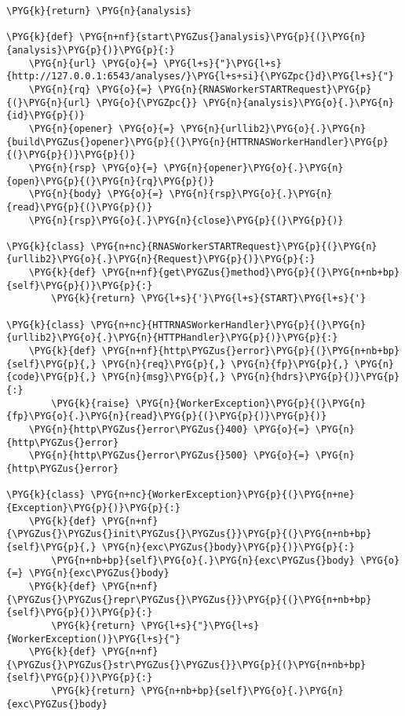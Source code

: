 \begin{Verbatim}[commandchars=\\\{\}]
    \PYG{k}{return} \PYG{n}{analysis}

\PYG{k}{def} \PYG{n+nf}{start\PYGZus{}analysis}\PYG{p}{(}\PYG{n}{analysis}\PYG{p}{)}\PYG{p}{:}
    \PYG{n}{url} \PYG{o}{=} \PYG{l+s}{"}\PYG{l+s}{http://127.0.0.1:6543/analyses/}\PYG{l+s+si}{\PYGZpc{}d}\PYG{l+s}{"}
    \PYG{n}{rq} \PYG{o}{=} \PYG{n}{RNASWorkerSTARTRequest}\PYG{p}{(}\PYG{n}{url} \PYG{o}{\PYGZpc{}} \PYG{n}{analysis}\PYG{o}{.}\PYG{n}{id}\PYG{p}{)}
    \PYG{n}{opener} \PYG{o}{=} \PYG{n}{urllib2}\PYG{o}{.}\PYG{n}{build\PYGZus{}opener}\PYG{p}{(}\PYG{n}{HTTRNASWorkerHandler}\PYG{p}{(}\PYG{p}{)}\PYG{p}{)}
    \PYG{n}{rsp} \PYG{o}{=} \PYG{n}{opener}\PYG{o}{.}\PYG{n}{open}\PYG{p}{(}\PYG{n}{rq}\PYG{p}{)}
    \PYG{n}{body} \PYG{o}{=} \PYG{n}{rsp}\PYG{o}{.}\PYG{n}{read}\PYG{p}{(}\PYG{p}{)}
    \PYG{n}{rsp}\PYG{o}{.}\PYG{n}{close}\PYG{p}{(}\PYG{p}{)}

\PYG{k}{class} \PYG{n+nc}{RNASWorkerSTARTRequest}\PYG{p}{(}\PYG{n}{urllib2}\PYG{o}{.}\PYG{n}{Request}\PYG{p}{)}\PYG{p}{:}
    \PYG{k}{def} \PYG{n+nf}{get\PYGZus{}method}\PYG{p}{(}\PYG{n+nb+bp}{self}\PYG{p}{)}\PYG{p}{:}
        \PYG{k}{return} \PYG{l+s}{'}\PYG{l+s}{START}\PYG{l+s}{'}

\PYG{k}{class} \PYG{n+nc}{HTTRNASWorkerHandler}\PYG{p}{(}\PYG{n}{urllib2}\PYG{o}{.}\PYG{n}{HTTPHandler}\PYG{p}{)}\PYG{p}{:}
    \PYG{k}{def} \PYG{n+nf}{http\PYGZus{}error}\PYG{p}{(}\PYG{n+nb+bp}{self}\PYG{p}{,} \PYG{n}{req}\PYG{p}{,} \PYG{n}{fp}\PYG{p}{,} \PYG{n}{code}\PYG{p}{,} \PYG{n}{msg}\PYG{p}{,} \PYG{n}{hdrs}\PYG{p}{)}\PYG{p}{:}
        \PYG{k}{raise} \PYG{n}{WorkerException}\PYG{p}{(}\PYG{n}{fp}\PYG{o}{.}\PYG{n}{read}\PYG{p}{(}\PYG{p}{)}\PYG{p}{)}
    \PYG{n}{http\PYGZus{}error\PYGZus{}400} \PYG{o}{=} \PYG{n}{http\PYGZus{}error}
    \PYG{n}{http\PYGZus{}error\PYGZus{}500} \PYG{o}{=} \PYG{n}{http\PYGZus{}error}

\PYG{k}{class} \PYG{n+nc}{WorkerException}\PYG{p}{(}\PYG{n+ne}{Exception}\PYG{p}{)}\PYG{p}{:}
    \PYG{k}{def} \PYG{n+nf}{\PYGZus{}\PYGZus{}init\PYGZus{}\PYGZus{}}\PYG{p}{(}\PYG{n+nb+bp}{self}\PYG{p}{,} \PYG{n}{exc\PYGZus{}body}\PYG{p}{)}\PYG{p}{:}
        \PYG{n+nb+bp}{self}\PYG{o}{.}\PYG{n}{exc\PYGZus{}body} \PYG{o}{=} \PYG{n}{exc\PYGZus{}body}
    \PYG{k}{def} \PYG{n+nf}{\PYGZus{}\PYGZus{}repr\PYGZus{}\PYGZus{}}\PYG{p}{(}\PYG{n+nb+bp}{self}\PYG{p}{)}\PYG{p}{:}
        \PYG{k}{return} \PYG{l+s}{"}\PYG{l+s}{WorkerException()}\PYG{l+s}{"}
    \PYG{k}{def} \PYG{n+nf}{\PYGZus{}\PYGZus{}str\PYGZus{}\PYGZus{}}\PYG{p}{(}\PYG{n+nb+bp}{self}\PYG{p}{)}\PYG{p}{:}
        \PYG{k}{return} \PYG{n+nb+bp}{self}\PYG{o}{.}\PYG{n}{exc\PYGZus{}body}
\end{Verbatim}


